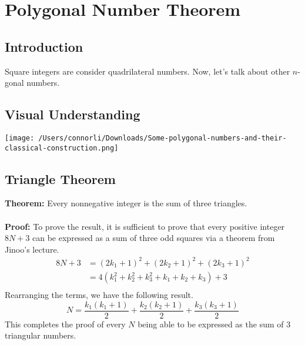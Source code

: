 \documentclass[8pt]{extarticle}
\begin{document}
\pagebreak
\section{Polygonal Number Theorem}
\subsection{Introduction}
Square integers are consider quadrilateral numbers. Now, let's talk about other $n$-gonal numbers.
\subsection{Visual Understanding}
\begin{center}
    \texttt{[image: /Users/connorli/Downloads/Some-polygonal-numbers-and-their-classical-construction.png]}
\end{center}
\subsection{Triangle Theorem}
\begin{boxedsection}
    \textbf{Theorem:} Every nonnegative integer is the sum of three triangles.\\
    \\
    \textbf{Proof:} To prove the result, it is sufficient to prove that every positive integer $8N + 3$ can be expressed as a sum of three odd squares via a theorem from Jinoo's lecture. 
    \begin{align*}
        8N + 3 &= (2k_1 + 1)^2 + (2k_2 + 1)^2 + (2k_3 + 1)^2 \\
        &= 4(k_1^2 + k_2^2 + k_3^2 + k_1 + k_2 + k_3) + 3\\
    \end{align*}
    Rearranging the terms, we have the following result.
    $$
    N = \frac{k_1(k_1+1)}{2} + \frac{k_2(k_2+1)}{2} + \frac{k_3(k_3+1)}{2}
    $$
    This completes the proof of every $N$ being able to be expressed as the sum of $3$ triangular numbers.
\end{boxedsection}
\end{document}
